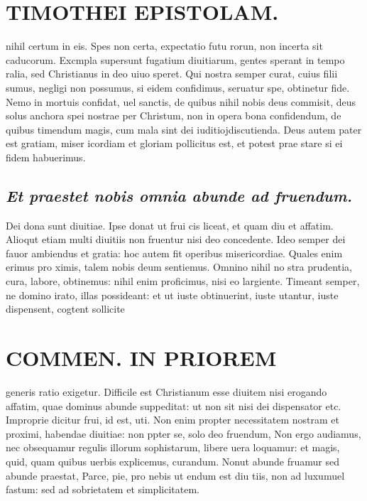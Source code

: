 \documentclass{article}
\begin{document}
\begin{pages}
\section*{TIMOTHEI EPISTOLAM. }
\marginpar{[ p.181 ]}\pstart nihil certum in eis. Spes non certa, expectatio futu rorun, non incerta sit caducorum. Excmpla supersunt fugatium diuitiarum, gentes sperant in tempo ralia, sed Christianus in deo uiuo speret. Qui nostra semper curat, cuius filii sumus, negligi non possumus, si eidem confidimus, seruatur spe, obtinetur fide. Nemo in mortuis confidat, uel sanctis, de quibus nihil nobis deus commisit, deus solus anchora spei nostrae per Christum, non in opera bona confidendum, de quibus timendum magis, cum mala sint dei iuditiojdiscutienda. Deus autem pater est gratiam, miser icordiam et gloriam pollicitus est, et potest prae stare si ei fidem habuerimus.  \pend
{}
{}
\subsection*{\textit{Et praestet nobis omnia abunde ad fruendum. }}\pstart Dei dona sunt diuitiae. Ipse donat ut frui cis liceat, et quam diu et affatim. Alioqut etiam multi diuitiis non fruentur nisi deo concedente. Ideo semper dei fauor ambiendus et gratia: hoc autem fit operibus misericordiae. Quales enim erimus pro ximis, talem nobis deum sentiemus. Omnino nihil no stra prudentia, cura, labore, obtinemus: nihil enim proficimus, nisi eo largiente. Timeant semper, ne domino irato, illas possideant: et ut iuste obtinuerint, iuste utantur, iuste dispensent, cogtent sollicite  \pend
\section*{COMMEN. IN PRIOREM }
\marginpar{[ p.182 ]}\pstart generis ratio exigetur. Difficile est Christianum esse diuitem nisi erogando affatim, quae dominus abunde suppeditat: ut non sit nisi dei dispensator etc.  \pend\pstart Improprie dicitur frui, id est, uti. Non enim propter necessitatem nostram et proximi, habendae diuitiae: non ppter se, solo deo fruendum, Non ergo audiamus, nec obsequamur regulis illorum sophistarum, libere uera loquamur: et magis, quid, quam quibus uerbis explicemus, curandum. Nonut abunde fruamur sed abunde praestat, Parce, pie, pro nebis ut endum est diu tiis, non ad luxumuel fastum: sed ad sobrietatem et simplicitatem.  \pend
{}
{}

\end{pages}
\end{document}
